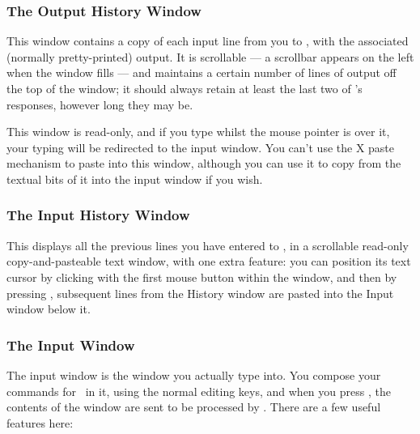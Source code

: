 \subsubsection{The Output History Window}

This window contains a copy of each input line from you to \REDUCE{},
with the associated (normally pretty-printed) output.  It is
scrollable --- a scrollbar appears on the left when the window fills
--- and maintains a certain number of lines of output off the top of
the window; it should always retain at least the last two of
\REDUCE{}'s responses, however long they may be.

This window is read-only, and if you type whilst the mouse pointer is
over it, your typing will be redirected to the input window.  You
can't use the X paste mechanism to paste into this window, although
you can use it to copy from the textual bits of it into the input
window if you wish.

\subsubsection{The Input History Window}

This displays all the previous lines you have entered to \REDUCE{}, in
a scrollable read-only copy-and-pasteable text window, with one extra
feature: you can position its text cursor by clicking with the first
mouse button within the window, and then by pressing ,
subsequent lines from the History window are pasted into the Input
window below it.

\subsubsection{The Input Window}

The input window is the window you actually type into.  You compose
your commands for \REDUCE\ in it, using the normal editing keys, and
when you press , the contents of the window are sent to
be processed by \REDUCE{}.  There are a few useful features here:

